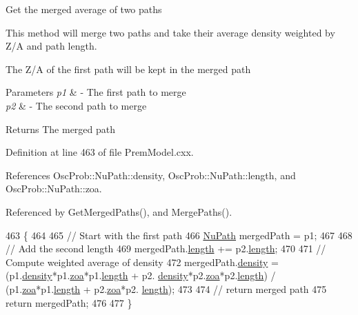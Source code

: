 Get the merged average of two paths

This method will merge two paths and take their average density weighted by Z/A and path length.

The Z/A of the first path will be kept in the merged path


\begin{DoxyParams}{Parameters}
{\em p1} & -\/ The first path to merge \\
\hline
{\em p2} & -\/ The second path to merge \\
\hline
\end{DoxyParams}
\begin{DoxyReturn}{Returns}
The merged path 
\end{DoxyReturn}


Definition at line 463 of file Prem\+Model.\+cxx.



References Osc\+Prob\+::\+Nu\+Path\+::density, Osc\+Prob\+::\+Nu\+Path\+::length, and Osc\+Prob\+::\+Nu\+Path\+::zoa.



Referenced by Get\+Merged\+Paths(), and Merge\+Paths().


\begin{DoxyCode}
463                                              \{
464 
465   \textcolor{comment}{// Start with the first path}
466   \hyperlink{structOscProb_1_1NuPath}{NuPath} mergedPath = p1;
467 
468   \textcolor{comment}{// Add the second length}
469   mergedPath.\hyperlink{structOscProb_1_1NuPath_af22660894b6e25cf835500381b155557}{length} += p2.\hyperlink{structOscProb_1_1NuPath_af22660894b6e25cf835500381b155557}{length};
470 
471   \textcolor{comment}{// Compute weighted average of density}
472   mergedPath.\hyperlink{structOscProb_1_1NuPath_a54ddd451db69bc54434de3cf18a117ca}{density} = (p1.\hyperlink{structOscProb_1_1NuPath_a54ddd451db69bc54434de3cf18a117ca}{density}*p1.\hyperlink{structOscProb_1_1NuPath_af3213f3691ba83c6bc05f4a3490f6b31}{zoa}*p1.\hyperlink{structOscProb_1_1NuPath_af22660894b6e25cf835500381b155557}{length} + p2.
      \hyperlink{structOscProb_1_1NuPath_a54ddd451db69bc54434de3cf18a117ca}{density}*p2.\hyperlink{structOscProb_1_1NuPath_af3213f3691ba83c6bc05f4a3490f6b31}{zoa}*p2.\hyperlink{structOscProb_1_1NuPath_af22660894b6e25cf835500381b155557}{length}) / (p1.\hyperlink{structOscProb_1_1NuPath_af3213f3691ba83c6bc05f4a3490f6b31}{zoa}*p1.\hyperlink{structOscProb_1_1NuPath_af22660894b6e25cf835500381b155557}{length} + p2.\hyperlink{structOscProb_1_1NuPath_af3213f3691ba83c6bc05f4a3490f6b31}{zoa}*p2.
      \hyperlink{structOscProb_1_1NuPath_af22660894b6e25cf835500381b155557}{length});
473 
474   \textcolor{comment}{// return merged path}
475   \textcolor{keywordflow}{return} mergedPath;
476 
477 \}
\end{DoxyCode}
\mbox{\label{classOscProb_1_1PremModel_a9a1d78e29217bb0dd00ae3bd96d22b69}} 
